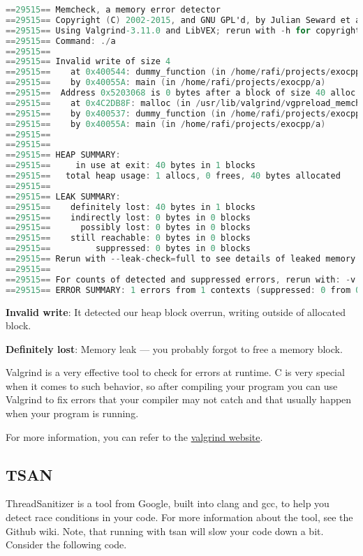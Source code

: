 \begin{lstlisting}[language=C]
==29515== Memcheck, a memory error detector
==29515== Copyright (C) 2002-2015, and GNU GPL'd, by Julian Seward et al.
==29515== Using Valgrind-3.11.0 and LibVEX; rerun with -h for copyright info
==29515== Command: ./a
==29515== 
==29515== Invalid write of size 4
==29515==    at 0x400544: dummy_function (in /home/rafi/projects/exocpp/a)
==29515==    by 0x40055A: main (in /home/rafi/projects/exocpp/a)
==29515==  Address 0x5203068 is 0 bytes after a block of size 40 alloc'd
==29515==    at 0x4C2DB8F: malloc (in /usr/lib/valgrind/vgpreload_memcheck-amd64-linux.so)
==29515==    by 0x400537: dummy_function (in /home/rafi/projects/exocpp/a)
==29515==    by 0x40055A: main (in /home/rafi/projects/exocpp/a)
==29515== 
==29515== 
==29515== HEAP SUMMARY:
==29515==     in use at exit: 40 bytes in 1 blocks
==29515==   total heap usage: 1 allocs, 0 frees, 40 bytes allocated
==29515== 
==29515== LEAK SUMMARY:
==29515==    definitely lost: 40 bytes in 1 blocks
==29515==    indirectly lost: 0 bytes in 0 blocks
==29515==      possibly lost: 0 bytes in 0 blocks
==29515==    still reachable: 0 bytes in 0 blocks
==29515==         suppressed: 0 bytes in 0 blocks
==29515== Rerun with --leak-check=full to see details of leaked memory
==29515== 
==29515== For counts of detected and suppressed errors, rerun with: -v
==29515== ERROR SUMMARY: 1 errors from 1 contexts (suppressed: 0 from 0)
\end{lstlisting}

\textbf{Invalid write}: It detected our heap block overrun, writing outside of allocated block.

\textbf{Definitely lost}: Memory leak --- you probably forgot to free a memory block.

Valgrind is a very effective tool to check for errors at runtime. C is very special when it comes to such behavior, so after compiling your program you can use Valgrind to fix errors that your compiler may not catch and that usually happen when your program is running.

For more information, you can refer to the \href{http://valgrind.org/docs/manual/quick-start.html}{valgrind website}.

\subsection{TSAN}

ThreadSanitizer is a tool from Google, built into clang and gcc, to help you detect race conditions in your code. For more information about the tool, see the Github wiki. Note, that running with tsan will slow your code down a bit. Consider the following code.

